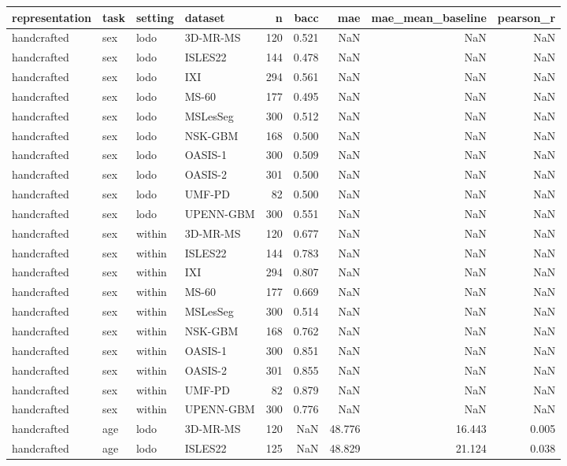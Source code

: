 \begin{tabular}{llllrrrrr}
\toprule
representation & task & setting & dataset & n & bacc & mae & mae\_mean\_baseline & pearson\_r \\
\midrule
handcrafted & sex & lodo & 3D-MR-MS & 120 & 0.521 & NaN & NaN & NaN \\
handcrafted & sex & lodo & ISLES22 & 144 & 0.478 & NaN & NaN & NaN \\
handcrafted & sex & lodo & IXI & 294 & 0.561 & NaN & NaN & NaN \\
handcrafted & sex & lodo & MS-60 & 177 & 0.495 & NaN & NaN & NaN \\
handcrafted & sex & lodo & MSLesSeg & 300 & 0.512 & NaN & NaN & NaN \\
handcrafted & sex & lodo & NSK-GBM & 168 & 0.500 & NaN & NaN & NaN \\
handcrafted & sex & lodo & OASIS-1 & 300 & 0.509 & NaN & NaN & NaN \\
handcrafted & sex & lodo & OASIS-2 & 301 & 0.500 & NaN & NaN & NaN \\
handcrafted & sex & lodo & UMF-PD & 82 & 0.500 & NaN & NaN & NaN \\
handcrafted & sex & lodo & UPENN-GBM & 300 & 0.551 & NaN & NaN & NaN \\
handcrafted & sex & within & 3D-MR-MS & 120 & 0.677 & NaN & NaN & NaN \\
handcrafted & sex & within & ISLES22 & 144 & 0.783 & NaN & NaN & NaN \\
handcrafted & sex & within & IXI & 294 & 0.807 & NaN & NaN & NaN \\
handcrafted & sex & within & MS-60 & 177 & 0.669 & NaN & NaN & NaN \\
handcrafted & sex & within & MSLesSeg & 300 & 0.514 & NaN & NaN & NaN \\
handcrafted & sex & within & NSK-GBM & 168 & 0.762 & NaN & NaN & NaN \\
handcrafted & sex & within & OASIS-1 & 300 & 0.851 & NaN & NaN & NaN \\
handcrafted & sex & within & OASIS-2 & 301 & 0.855 & NaN & NaN & NaN \\
handcrafted & sex & within & UMF-PD & 82 & 0.879 & NaN & NaN & NaN \\
handcrafted & sex & within & UPENN-GBM & 300 & 0.776 & NaN & NaN & NaN \\
handcrafted & age & lodo & 3D-MR-MS & 120 & NaN & 48.776 & 16.443 & 0.005 \\
handcrafted & age & lodo & ISLES22 & 125 & NaN & 48.829 & 21.124 & 0.038 \\

\end{tabular}
